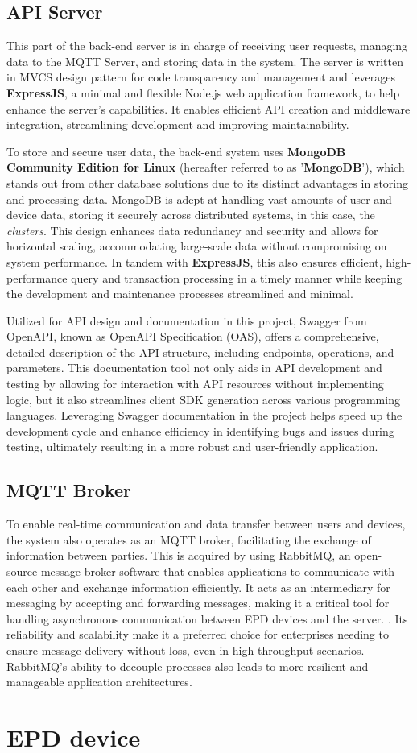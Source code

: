\documentclass[../Main.tex]{subfiles}
\begin{document}
\subsection{API Server}
This part of the back-end server is in charge of receiving user requests, managing data to the MQTT Server, and storing data in the system. The server is written in MVCS design pattern for code transparency and management and leverages \textbf{ExpressJS}, a minimal and flexible Node.js web application framework, to help enhance the server's capabilities. It enables efficient API creation and middleware integration, streamlining development and improving maintainability.

To store and secure user data, the back-end system uses \textbf{MongoDB Community Edition for Linux} (hereafter referred to as '\textbf{MongoDB}'), which stands out from other database solutions due to its distinct advantages in storing and processing data. MongoDB is adept at handling vast amounts of user and device data, storing it securely across distributed systems, in this case, the \textit{clusters}. This design enhances data redundancy and security and allows for horizontal scaling, accommodating large-scale data without compromising on system performance. In tandem with \textbf{ExpressJS}, this also ensures efficient, high-performance query and transaction processing in a timely manner while keeping the development and maintenance processes streamlined and minimal.

Utilized for API design and documentation in this project, Swagger from OpenAPI, known as OpenAPI Specification (OAS), offers a comprehensive, detailed description of the API structure, including endpoints, operations, and parameters. This documentation tool not only aids in API development and testing by allowing for interaction with API resources without implementing logic, but it also streamlines client SDK generation across various programming languages. Leveraging Swagger documentation in the project helps speed up the development cycle and enhance efficiency in identifying bugs and issues during testing, ultimately resulting in a more robust and user-friendly application.

\subsection{MQTT Broker}
To enable real-time communication and data transfer between users and devices, the system also operates as an MQTT broker, facilitating the exchange of information between parties. This is acquired by using RabbitMQ, an open-source message broker software that enables applications to communicate with each other and exchange information efficiently. It acts as an intermediary for messaging by accepting and forwarding messages, making it a critical tool for handling asynchronous communication between EPD devices and the server. . Its reliability and scalability make it a preferred choice for enterprises needing to ensure message delivery without loss, even in high-throughput scenarios. RabbitMQ's ability to decouple processes also leads to more resilient and manageable application architectures.

\section{EPD device}
\end{document}
